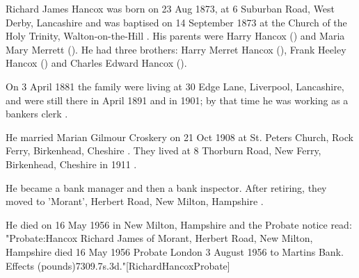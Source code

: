 
Richard James Hancox was born on 23 Aug 1873, at 6 Suburban Road, West Derby, Lancashire \cite{RJHancoxBirth} and was baptised on 14 September 1873 at the Church of the Holy Trinity, Walton-on-the-Hill \cite{RJHancoxBaptism}.  His parents were Harry Hancox () and  Maria Mary Merrett (). He had three brothers: Harry Merret Hancox (), Frank Heeley Hancox () and Charles Edward Hancox ().


On 3 April 1881 the family were living at 30 Edge Lane, Liverpool, Lancashire, \cite{RJHancoxResidence1} and were still there in April 1891 \cite{RJHancoxResidence2} and in 1901; by that time he was working as a bankers clerk \cite{RJHancoxOccupation}.

He married Marian Gilmour Croskery on 21 Oct 1908 at St. Peters Church,  Rock Ferry, Birkenhead, Cheshire \cite{RJHancoxMarriage}.  They lived at 8 Thorburn Road, New Ferry, Birkenhead, Cheshire in 1911 \cite{RJHancoxResidence3}.

He became a bank manager and then a bank inspector.  After retiring, they moved to 'Morant', Herbert Road, New Milton, Hampshire \cite{RJHancoxResidence4}.


He died on 16 May 1956  in New Milton, Hampshire \cite{RJHancoxDeath} and the Probate notice read:
"Probate:Hancox Richard James of Morant, Herbert Road, New Milton, Hampshire died 16 May 1956 Probate London 3 August 1956 to Martins Bank. Effects (pounds)7309.7s.3d."[RichardHancoxProbate]
